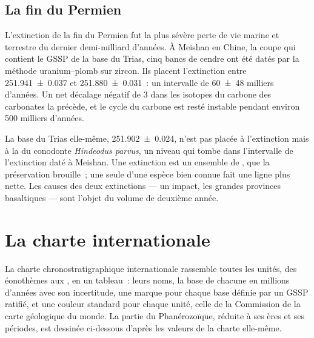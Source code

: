 \subsection*{La fin du Permien}

L'extinction de la fin du Permien fut la plus sévère perte de vie marine et
terrestre du dernier demi-milliard d'années. À Meishan en Chine, la coupe qui
contient le GSSP de la base du Trias, cinq bancs de cendre ont été datés par la
méthode uranium--plomb sur zircon. Ils placent l'extinction entre
\qty[uncertainty-mode=separate]{251.941(37)}{\Ma} et \qty[uncertainty-mode=separate]{251.880(31)}{\Ma}~: un intervalle de
\num[uncertainty-mode=separate]{60 \pm 48} milliers d'années. Un net décalage négatif de \qty{3}{\permil} dans
les isotopes du carbone des carbonates la précède, et le cycle du carbone est resté
instable pendant environ \num{500} milliers d'années.

La base du Trias elle-même, \qty[uncertainty-mode=separate]{251.902(24)}{\Ma}, n'est pas placée à
l'extinction mais à la  du conodonte \emph{Hindeodus parvus},
un niveau qui tombe dans l'intervalle de l'extinction daté à Meishan. Une
extinction est un ensemble de , que la préservation brouille~; une seule  d'une espèce bien connue fait une ligne plus nette. Les causes des deux extinctions ---
un impact, les grandes provinces basaltiques --- sont l'objet du volume de deuxième année.

\section{La charte internationale}\label{sec:b1:stratigraphic-scale:chart}

La charte chronostratigraphique internationale rassemble toutes les unités, des
éonothèmes aux , en un tableau~: leurs noms, la base de chacune en millions
d'années avec son incertitude, une marque pour chaque base définie par un GSSP ratifié,
et une couleur standard pour chaque unité, celle de la Commission de la carte
géologique du monde. La
partie du Phanérozoïque, réduite à ses ères et ses périodes, est dessinée ci-dessous d'après les
valeurs de la charte elle-même.

